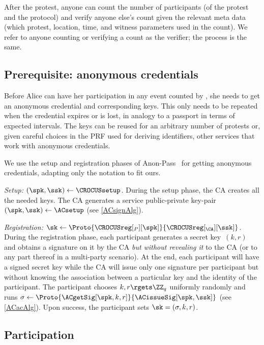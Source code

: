 After the protest, anyone can count the number of participants (of the protest and the
protocol) and verify anyone else's count given the relevant meta data
(which protest, location, time, and witness parameters used in the
count). We refer to anyone counting or verifying a count as the
verifier; the process is the same. 

\subsection{Prerequisite: anonymous credentials}%
\label{ProtocolSetup}

Before Alice can have her participation in any event counted by
\CROCUS, she needs to get an anonymous credential and corresponding
keys. This only needs to be repeated when the credential expires or is
lost, in analogy to a passport in terms of expected intervals. The
keys can be reused for an arbitrary number of protests or, given
careful choices in the PRF used for deriving identifiers, other
services that work with anonymous credentials. 

We use the setup and registration phases of Anon-Pass~\cite{AnonPass} for
getting anonymous credentials, adapting only the notation to fit ours. 


\emph{Setup: \((\spk, \ssk)\gets \CROCUSsetup\).}
During the setup phase, the \ac{CA} creates all the needed keys.
The \ac{CA} generates a service public-private key-pair \((\spk, \ssk)\gets 
  \ACsetup\) (see \cref{ACsignAlg}).

\emph{Registration: \(\sk\gets 
    \Proto{\CROCUSreg[_P][\spk]}{\CROCUSreg[_{\CA}][\ssk]}\).}
During the registration phase, each participant generates a secret key~\((k, 
  r)\) and obtains a signature on it by the \ac{CA} \emph{but without revealing 
  it} to the \ac{CA} (or to any part thereof in a multi-party scenario).
At the end, each participant will have a signed secret key while the \ac{CA} 
will issue only one signature per participant but without knowing the 
association between a particular key and the identity of the participant.
The participant chooses \(k, r\rgets \ZZ_q\) uniformly randomly and runs 
\(\sigma \gets \Proto{\ACgetSig[\spk, k, r]}{\ACissueSig[\spk, \ssk]}\) (see 
\cref{ACacAlg}).
Upon success, the participant sets \(\sk = (\sigma, k, r)\).



\subsection{Participation}%
\label{ProtocolDuring}


